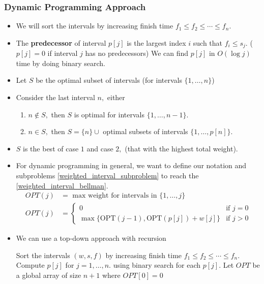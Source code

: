 \documentclass[a4paper,12pt]{article}
\begin{document}
\subsubsection{Dynamic Programming Approach}
\begin{itemize}
    \item We will sort the intervals by increasing finish time $f_1\leq f_2\leq\cdots\leq f_n.$
    \item The \textbf{predecessor} of interval $p[j]$ is the largest index $i$ such that $f_i\leq s_j.$ ($p[j]=0$ if interval $j$ has no predecessors) We can find $p[j]$ in $O(\log j)$ time by doing binary search.
    \item Let $S$ be the optimal subset of intervals (for intervals $\{1,\dots,n\}$)
    \item Consider the last interval $n,$ either
    \begin{enumerate}
        \item $n\notin S,$ then $S$ is optimal for intervals $\{1,\dots,n-1\}.$
        \item $n\in S,$ then $S=\{n\}\cup$ optimal subsets of intervals $\{1,\dots,p[n]\}.$
    \end{enumerate}
    \item $S$ is the best of case $1$ and case $2,$ (that with the highest total weight).
    \item For dynamic programming in general, we want to define our notation and subproblems \eqref{weighted_interval_subproblem} to reach the  \eqref{weighted_interval_bellman}.
    \begin{align}
        OPT(j)&=\text{ max weight for intervals in }\{1,\dots,j\}\label{weighted_interval_subproblem}\\
        OPT(j)&=\begin{cases}
            0 & \text{if }j=0\\
            \max\{\mathrm{OPT}(j-1),\mathrm{OPT}(p[j])+w[j]\} & \text{if }j>0
        \end{cases}\label{weighted_interval_bellman}
    \end{align}
    \item We can use a top-down approach with recursion
    \begin{algorithmic}[1]
        \State Sort the intervals $(w,s,f)$ by increasing finish time $f_1\leq f_2\leq\cdots\leq f_n.$
        \State Compute $p[j]$ for $j=1,\dots,n.$ using binary search for each $p[j].$
        \State Let $OPT$ be a global array of size $n+1$ where $OPT[0]=0$

\end{algorithmic}
\end{itemize}
\end{document}
